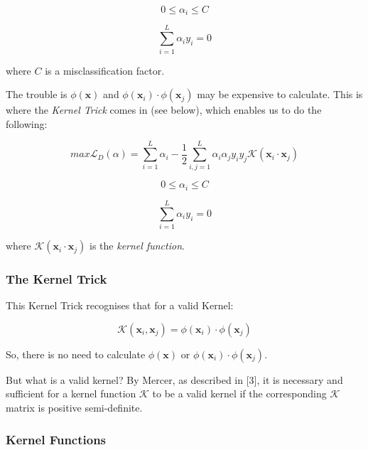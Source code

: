 \documentclass[10pt, a4paper,reqno]{amsart}
\begin{document}
\begin{equation}
0\leq\alpha_i\leq C
\end{equation}

\begin{equation}
\sum_{i=1}^{L}\alpha_i y_i = 0
\end{equation}

where $C$ is a misclassification factor.

The trouble is $\phi(\mathbf{x})$ and $\phi(\mathbf{x}_i)\cdot\phi(\mathbf{x}_j)$ may be expensive to calculate. This is where the \emph{Kernel Trick} comes in (see below), which enables us to do the following:

\begin{equation}
max\mathcal{L}_D(\alpha) = \sum_{i=1}^{L}\alpha_i - \frac{1}{2}\sum_{i,j=1}^{L}\alpha_i \alpha_j y_i y_j\mathcal{K}(\mathbf{x}_i\cdot\mathbf{x}_j)
\end{equation}

\begin{equation}
0\leq\alpha_i\leq C
\end{equation}

\begin{equation}
\sum_{i=1}^{L}\alpha_i y_i = 0
\end{equation}

where $\mathcal{K}(\mathbf{x}_i\cdot\mathbf{x}_j)$ is the \emph{kernel function}.


\subsubsection{The Kernel Trick}

This {Kernel Trick} recognises that for a valid Kernel:

\begin{equation}
\mathcal{K}(\mathbf{x}_i, \mathbf{x}_j) = \phi(\mathbf{x}_i)\cdot\phi(\mathbf{x}_j)
\end{equation}

So, there is no need to calculate  $\phi(\mathbf{x})$ or $\phi(\mathbf{x}_i)\cdot\phi(\mathbf{x}_j)$.

But what is a valid kernel? By Mercer, as described in [3], it is necessary and sufficient for a kernel function $\mathcal{K}$ to be a valid kernel if the corresponding $\mathcal{K}$ matrix is positive semi-definite.


\subsubsection{Kernel Functions}
\end{document}
